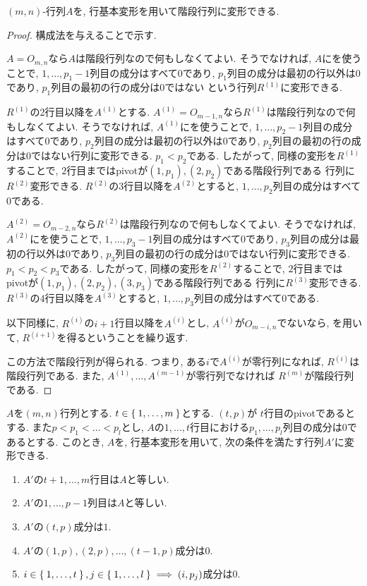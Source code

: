 \begin{theorem}
  \label{thm:reduction:f}
$(m,n)$-行列$A$を, 行基本変形を用いて階段行列に変形できる.
\end{theorem}
\begin{proof}
  構成法を与えることで示す.

  $A=O_{m,n}$なら$A$は階段行列なので何もしなくてよい.
  そうでなければ, $A$にを使うことで, 
  $1,\ldots,p_1-1$列目の成分はすべて$0$であり,
  $p_1$列目の成分は最初の行以外は$0$であり,
  $p_1$列目の最初の行の成分は$0$ではない
  という行列$R^{(1)}$に変形できる.

  $R^{(1)}$の2行目以降を$A^{(1)}$とする.
  $A^{(1)}=O_{m-1,n}$なら$R^{(1)}$は階段行列なので何もしなくてよい.
  そうでなければ, $A^{(1)}$にを使うことで, 
  $1,\ldots,p_2-1$列目の成分はすべて$0$であり,
  $p_2$列目の成分は最初の行以外は$0$であり,
  $p_2$列目の最初の行の成分は$0$ではない行列に変形できる.
  $p_1<p_2$である.
  したがって,
  同様の変形を$R^{(1)}$することで,
  $2$行目まではpivotが$(1,p_1),(2,p_2)$である階段行列である
  行列に$R^{(2)}$変形できる.
  $R^{(2)}$の$3$行目以降を$A^{(2)}$とすると,
  $1,\ldots,p_2$列目の成分はすべて$0$である.

  $A^{(2)}=O_{m-2,n}$なら$R^{(2)}$は階段行列なので何もしなくてよい.
  そうでなければ, $A^{(2)}$にを使うことで, 
  $1,\ldots,p_3-1$列目の成分はすべて$0$であり,
  $p_3$列目の成分は最初の行以外は$0$であり,
  $p_3$列目の最初の行の成分は$0$ではない行列に変形できる.
  $p_1<p_2<p_3$である.
  したがって,
  同様の変形を$R^{(2)}$することで,
  $2$行目まではpivotが$(1,p_1),(2,p_2),(3,p_3)$である階段行列である
  行列に$R^{(3)}$変形できる.
  $R^{(3)}$の$4$行目以降を$A^{(3)}$とすると,
  $1,\ldots,p_3$列目の成分はすべて$0$である.

  
  以下同様に,
  $R^{(i)}$の$i+1$行目以降を$A^{(i)}$とし,
  $A^{(i)}$が$O_{m-i,n}$でないなら,
  を用いて,
  $R^{(i+1)}$を得るということを繰り返す.

  この方法で階段行列が得られる.
  つまり,
  ある$i$で$A^{(i)}$が零行列になれば,
  $R^{(i)}$は階段行列である.
  また, $A^{(1)},\ldots,A^{(m-1)}$が零行列でなければ
  $R^{(m)}$が階段行列である.
\end{proof}

\begin{lemma}
  \label{lem:reduction:b}
  $A$を$(m,n)$行列とする.
  $t\in\Set{1,\ldots,m}$とする.
  $(t,p)$が
  $t$行目のpivotであるとする.
  また$p<p_1<\ldots<p_l$とし,
  $A$の$1,\ldots,t$行目における$p_1,\ldots,p_l$列目の成分は$0$であるとする.
  このとき, $A$を, 行基本変形を用いて,
  次の条件を満たす行列$A'$に変形できる.
  \begin{enumerate}
  \item $A'$の$t+1,\ldots,m$行目は$A$と等しい.
  \item $A'$の$1,\ldots,p-1$列目は$A$と等しい.
  \item $A'$の$(t,p)$成分は$1$.
  \item $A'$の$(1,p),(2,p),\ldots,(t-1,p)$成分は$0$.
  \item $i\in\Set{1,\ldots,t}, j\in\Set{1,\ldots,l}\implies (i,p_j)$成分は$0$.
  \end{enumerate}
\end{lemma}

